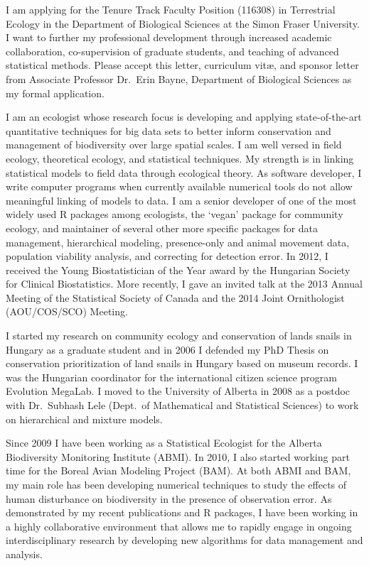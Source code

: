 \documentclass[11pt,letterpaper,roman]{moderncv}
\begin{document}
\makelettertitle

I am applying for the Tenure Track Faculty Position (116308) in Terrestrial Ecology in the Department of Biological Sciences at the Simon Fraser University. I want to further my professional development through increased academic collaboration, co-supervision of graduate students, and teaching of advanced statistical methods. Please accept this letter, curriculum vit\ae{}, and sponsor letter from Associate Professor Dr.~Erin Bayne, Department of Biological Sciences as my formal application.
\vspace{0.1pc}

I am an ecologist whose research focus is developing and applying state-of-the-art quantitative techniques for big data sets to better inform conservation and management of biodiversity over large spatial scales. I am well versed in field ecology, theoretical ecology, and statistical techniques. My strength is in linking statistical models to field data through ecological theory. As software developer, I write computer programs when currently available numerical tools do not allow meaningful linking of models to data. I am a senior developer of one of the most widely used R packages among ecologists, the `vegan' package for community ecology, and maintainer of several other more specific packages for data management, hierarchical modeling, presence-only and animal movement data, population viability analysis, and correcting for detection error. In 2012, I received the Young Biostatistician of the Year award by the Hungarian Society for Clinical Biostatistics.  More recently, I gave an invited talk at the 2013 Annual Meeting of the Statistical Society of Canada and the 2014 Joint Ornithologist (AOU/COS/SCO) Meeting.
\vspace{0.1pc}

I started my research on community ecology and conservation of lands snails in Hungary as a graduate student and in 2006 I defended my PhD Thesis on conservation prioritization of land snails in Hungary based on museum records. I was the Hungarian coordinator for the international citizen science program Evolution MegaLab. I moved to the University of Alberta in 2008 as a postdoc with Dr.~Subhash Lele (Dept.~of Mathematical and Statistical Sciences) to work on hierarchical and mixture models. 
\vspace{0.1pc}

Since 2009 I have been working as a Statistical Ecologist for the Alberta Biodiversity Monitoring Institute (ABMI). In 2010, I also started working part time for the Boreal Avian Modeling Project (BAM). At both ABMI and BAM, my main role has been developing numerical techniques to study the effects of human disturbance on biodiversity in the presence of observation error. As demonstrated by my recent publications and R packages, I have been working in a highly collaborative environment that allows me to rapidly engage in ongoing interdisciplinary research by developing new algorithms for data management and analysis.
\vspace{0.1pc}
\end{document}
